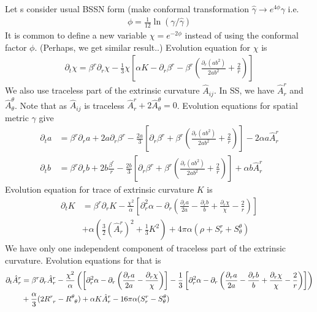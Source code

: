 \documentclass[prd]{revtex4}
\newcommand*\apost{\textsc{\char13}}
\begin{document}
Let \apost s consider usual BSSN form (make conformal transformation $\hat{\gamma} \rightarrow e^{4\phi} \gamma$ i.e.
\begin{align}
\phi = \frac{1}{12} \ln(\gamma / \hat{\gamma})
\end{align}
It is common to define a new variable $\chi = e^{-2 \phi}$ instead of using the conformal factor $\phi$. (Perhaps, we get similar result..) Evolution equation for $\chi$ is
\begin{align}
\partial_t \chi = \beta^r \partial_r \chi - \frac{1}{3} \chi \left[ \alpha K - \partial_r \beta^r - \beta^r \left(\frac{\partial_r (a b^2)}{2 a b^2} + \frac{2}{r}\right) \right]
\end{align}
We also use traceless part of the extrinsic curvature $\hat{A}_{ij}$. In SS, we have $\hat{A}^r_r$ and $\hat{A}^\theta_\theta$. Note that as $\hat{A}_{ij}$ is traceless $\hat{A}^r_r+2\hat{A}^\theta_\theta=0$. Evolution equations for spatial metric $\gamma$ give
\begin{align}
\partial_t a &= \beta^r \partial_r a + 2 a \partial_r \beta^r - \frac{2a}{3}\left[ \partial_r \beta^r +\beta^r \left(\frac{\partial_r (a b^2)}{2 a b^2} + \frac{2}{r}\right)\right] -2 \alpha a \hat{A}^r_r \\
\partial_t b &= \beta^r \partial_r b + 2 b \frac{\beta^r}{r} - \frac{2b}{3} \left[\partial_r \beta^r + \beta^r \left(\frac{\partial_r (a b^2)}{2 a b^2} + \frac{2}{r}\right)\right] + \alpha b \hat{A}^r_r
\end{align}
Evolution equation for trace of extrinsic curvature $K$ is
\begin{align}
\partial_t K &= \beta^r \partial_r K - \frac{\chi^2}{\alpha} \left[\partial_r^2 \alpha - \partial_r \left(\frac{\partial_r a}{2a} - \frac{\partial_r b}{b} +\frac{\partial_r \chi}{\chi} - \frac{2}{r} \right) \right] \nonumber \\
&+ \alpha \left(\frac{3}{2} (\hat{A}^r_r)^2 + \frac{1}{3} K^2 \right) + 4 \pi \alpha (\rho + S^r_r + S^\theta_\theta)
\end{align}
We have only one independent component of traceless part of the extrinsic curvature. Evolution equations for that is
\begin{align}
\partial_t \hat{A}^r_r &= \beta^r \partial_r \hat{A}^r_r - \frac{\chi^2}{\alpha}\left( \left[\partial_r^2 \alpha - \partial_r \left(\frac{\partial_r a}{2a} - \frac{\partial_r \chi}{\chi} \right) \right] -\frac{1}{3} \left[\partial_r^2 \alpha - \partial_r \left(\frac{\partial_r a}{2a} - \frac{\partial_r b}{b} +\frac{\partial_r \chi}{\chi} - \frac{2}{r} \right) \right] \right)\nonumber \\
&+\frac{\alpha}{3}(2 R\indices{^r_r} - R\indices{^\theta_\theta}) + \alpha K \hat{A}^r_r - 16\pi \alpha ( S^r_r - S^\theta_\theta)
\end{align}
\end{document}

